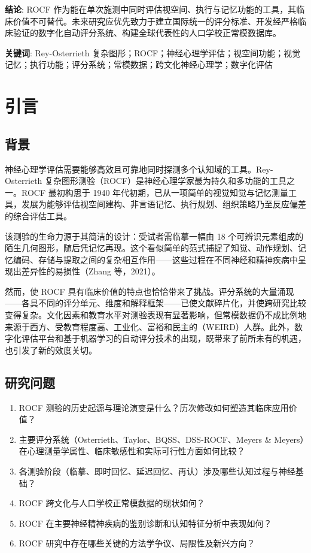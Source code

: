 \documentclass[12pt,a4paper]{ctexart}
\begin{document}
\textbf{结论}: ROCF 作为能在单次施测中同时评估视空间、执行与记忆功能的工具，其临床价值不可替代。未来研究应优先致力于建立国际统一的评分标准、开发经严格临床验证的数字化自动评分系统、构建全球代表性的人口学校正常模数据库。

\vspace{0.5cm}
\noindent\textbf{关键词}: Rey-Osterrieth 复杂图形；ROCF；神经心理学评估；视空间功能；视觉记忆；执行功能；评分系统；常模数据；跨文化神经心理学；数字化评估

\newpage

\tableofcontents
\newpage

\section{引言}

\subsection{背景}

神经心理学评估需要能够高效且可靠地同时探测多个认知域的工具。Rey-Osterrieth 复杂图形测验（ROCF）是神经心理学家最为持久和多功能的工具之一。ROCF 最初构思于 1940 年代初期，已从一项简单的视觉知觉与记忆测量工具，发展为能够评估视空间建构、非言语记忆、执行规划、组织策略乃至反应偏差的综合评估工具。

该测验的生命力源于其简洁的设计：受试者需临摹一幅由 18 个可辨识元素组成的陌生几何图形，随后凭记忆再现。这个看似简单的范式捕捉了知觉、动作规划、记忆编码、存储与提取之间的复杂相互作用——这些过程在不同神经和精神疾病中呈现出差异性的易损性（Zhang 等，2021）。

然而，使 ROCF 具有临床价值的特点也恰恰带来了挑战。评分系统的大量涌现——各具不同的评分单元、维度和解释框架——已使文献碎片化，并使跨研究比较变得复杂。文化因素和教育水平对测验表现有显著影响，但常模数据仍不成比例地来源于西方、受教育程度高、工业化、富裕和民主的（WEIRD）人群。此外，数字化评估平台和基于机器学习的自动评分技术的出现，既带来了前所未有的机遇，也引发了新的效度关切。

\subsection{研究问题}

\begin{enumerate}
\item ROCF 测验的历史起源与理论演变是什么？历次修改如何塑造其临床应用价值？
\item 主要评分系统（Osterrieth、Taylor、BQSS、DSS-ROCF、Meyers \& Meyers）在心理测量学属性、临床敏感性和实际可行性方面如何比较？
\item 各测验阶段（临摹、即时回忆、延迟回忆、再认）涉及哪些认知过程与神经基础？
\item ROCF 跨文化与人口学校正常模数据的现状如何？
\item ROCF 在主要神经精神疾病的鉴别诊断和认知特征分析中表现如何？
\item ROCF 研究中存在哪些关键的方法学争议、局限性及新兴方向？
\end{enumerate}
\end{document}
